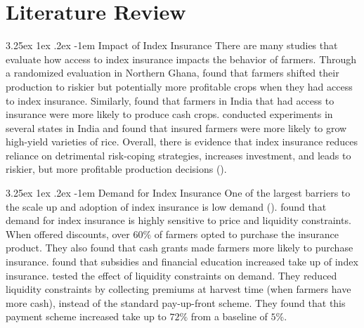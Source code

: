 \documentclass[11pt]{article}
\makeatletter
\renewcommand\paragraph{\@startsection{paragraph}{5}{\z@}%
  {3.25ex \@plus1ex \@minus.2ex}%
  {-1em}%
  {\normalfont\normalsize\bfseries}}
\makeatother
\begin{document}
\section{Literature Review}
\paragraph{Impact of Index Insurance} There are many studies that evaluate how access to index insurance impacts the behavior of farmers. Through a randomized evaluation in Northern Ghana, \cite{karlan2014agricultural} found that farmers shifted their production to riskier but potentially more profitable crops when they had access to index insurance. Similarly, \cite{cole2013barriers} found that farmers in India that had access to insurance were more likely to produce cash crops. \cite{mobarak2013informal} conducted experiments in several states in India and found that insured farmers were more likely to grow high-yield varieties of rice. Overall, there is evidence that index insurance reduces reliance on detrimental risk-coping strategies, increases investment, and leads to riskier, but more profitable production decisions (\cite{jensen2017agricultural}). 

\paragraph{Demand for Index Insurance} One of the largest barriers to the scale up and adoption of index insurance is low demand (\cite{jensen2017agricultural}). \cite{cole2013barriers} found that demand for index insurance is highly sensitive to price and liquidity constraints. When offered discounts, over $60\%$ of farmers opted to purchase the insurance product. They also found that cash grants made farmers more likely to purchase insurance. \cite{cai2020subsidy} found that subsidies and financial education increased take up of index insurance. \cite{casaburi2018time} tested the effect of liquidity constraints on demand. They reduced liquidity constraints by collecting premiums at harvest time (when farmers have more cash), instead of the standard pay-up-front scheme. They found that this payment scheme increased take up to $72\%$ from a baseline of $5\%$. 
\end{document}
